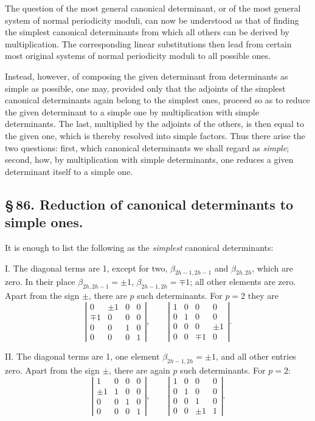 \documentclass[10pt]{article}
\begin{document}
The question of the most general canonical determinant, or of the most general system of normal periodicity moduli, can now be understood as that of finding the simplest canonical determinants from which all others can be derived by multiplication. The corresponding linear substitutions then lead from certain most original systems of normal periodicity moduli to all possible ones.

Instead, however, of composing the given determinant from determinants as simple as possible, one may, provided only that the adjoints of the simplest canonical determinants again belong to the simplest ones, proceed so as to reduce the given determinant to a simple one by multiplication with simple determinants. The last, multiplied by the adjoints of the others, is then equal to the given one, which is thereby resolved into simple factors. Thus there arise the two questions: first, which canonical determinants we shall regard as \emph{simple}; second, how, by multiplication with simple determinants, one reduces a given determinant itself to a simple one.

\subsection*{\S\,86. Reduction of canonical determinants to simple ones.}

It is enough to list the following as the \emph{simplest} canonical determinants:

I. The diagonal terms are 1, except for two, \(\beta_{2h-1,2h-1}\) and \(\beta_{2h,2h}\), which are zero. In their place \(\beta_{2h,2h-1}=\pm1\), \(\beta_{2h-1,2h}=\mp1\); all other elements are zero. Apart from the sign \(\pm\), there are \(p\) such determinants. For \(p=2\) they are
\[
\left|\begin{array}{rrrr}0&\pm1&0&0\\ \mp1&0&0&0\\ 0&0&1&0\\ 0&0&0&1\end{array}\right|,
\qquad
\left|\begin{array}{rrrr}1&0&0&0\\ 0&1&0&0\\ 0&0&0&\pm1\\ 0&0&\mp1&0\end{array}\right|.
\]

II. The diagonal terms are 1, one element \(\beta_{2h-1,2h}=\pm1\), and all other entries zero. Apart from the sign \(\pm\), there are again \(p\) such determinants. For \(p=2\):
\[
\left|\begin{array}{rrrr}1&0&0&0\\ \pm1&1&0&0\\ 0&0&1&0\\ 0&0&0&1\end{array}\right|,
\qquad
\left|\begin{array}{rrrr}1&0&0&0\\ 0&1&0&0\\ 0&0&1&0\\ 0&0&\pm1&1\end{array}\right|.
\]
\end{document}
